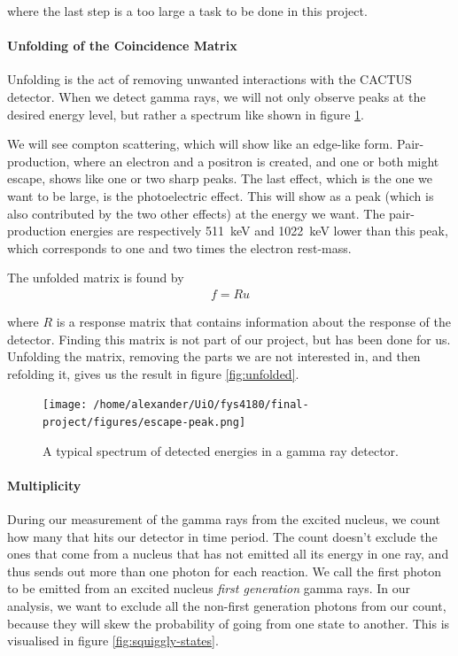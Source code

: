 \documentclass[a4paper,12pt]{article}
\newcommand{\eq}[1]{{\small\begin{align*}#1\end{align*}}}
\begin{document}
where the last step is a too large a task to be done
in this project.

\paragraph{Unfolding of the Coincidence Matrix}
Unfolding is the act of removing unwanted interactions with
the CACTUS detector. 
When we detect gamma rays, we
will not only observe peaks at the desired energy level,
but rather a spectrum like shown in figure \ref{fig:peaks}.

We will see compton scattering, which will show like an
edge-like form. Pair-production, where an electron and a
positron is created, and one or both might escape,
shows like one or two sharp peaks. 
The last effect, which is the one we want to be large,
is the photoelectric effect. This will show as a peak
(which is also contributed by the two other effects)
at the energy we want. The pair-production energies
are respectively \SI{511}{\kilo\electronvolt} 
and \SI{1022}{\kilo\electronvolt} lower than this peak,
which corresponds to one and two times the electron rest-mass.

The unfolded matrix is found by
\eq{f = Ru}

where $R$ is a response matrix that contains information
about the response of the detector.
Finding this matrix is not part of our project, but has been done for us.
Unfolding the matrix, removing the parts we are not interested in,
and then refolding it, gives us the result in figure \ref{fig:unfolded}.

\begin{figure}[H]
    \centering
    \texttt{[image: /home/alexander/UiO/fys4180/final-project/figures/escape-peak.png]}
    \caption{A typical spectrum of detected energies in a gamma ray detector.}
    \label{fig:peaks}
\end{figure}


\paragraph{Multiplicity}
During our measurement of the gamma rays from the excited nucleus,
we count how many that hits our detector in time period.
The count doesn't exclude the ones that come from a nucleus
that has not emitted all its energy in one ray, and thus
sends out more than one photon for each reaction.
We call the first photon to be emitted from an excited nucleus
\textit{first generation} gamma rays. In our analysis,
we want to exclude all the non-first generation photons from
our count, because they will skew the probability of going
from one state to another.
This is visualised in figure \ref{fig:squiggly-states}.
\end{document}

